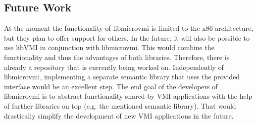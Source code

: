 \documentclass[sigconf]{acmart}
\begin{document}
\subsection{Future Work}

At the moment the functionality of libmicrovmi is limited to the x86 architecture, but they plan to offer support for others.
In the future, it will also be possible to use libVMI in conjunction with libmicrovmi. This would combine the functionality and thus the advantages of both libraries.
Therefore, there is already a repository \cite{libmicrovmiintegrationlibvmi} that is currently being worked on.
\newline
\newline
Independently of libmicrovmi, implementing a separate semantic library that uses the provided interface would be an excellent step.
The end goal of the developers of libmicrovmi is to abstract functionality shared by VMI applications with the help of further libraries on top (e.g. the mentioned semantic library).
That would drastically simplify the development of new VMI applications in the future.
\newpage




\appendix
\end{document}
